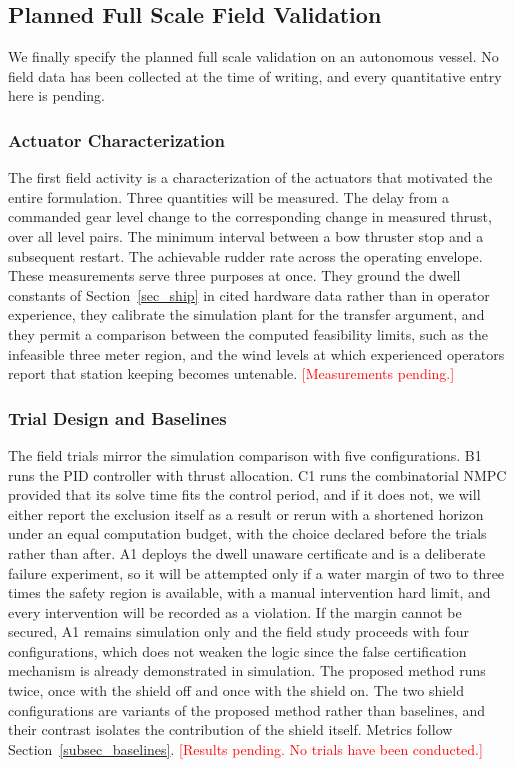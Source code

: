 \documentclass[journal]{IEEEtran}
\begin{document}
\subsection{Planned Full Scale Field Validation}\label{sec_fullscale}


We finally specify the planned full scale validation on an autonomous vessel. No field data has been collected at the time of writing, and every quantitative entry here is pending.

\subsubsection{Actuator Characterization}

The first field activity is a characterization of the actuators that motivated the entire formulation. Three quantities will be measured. The delay from a commanded gear level change to the corresponding change in measured thrust, over all level pairs. The minimum interval between a bow thruster stop and a subsequent restart. The achievable rudder rate across the operating envelope. These measurements serve three purposes at once. They ground the dwell constants of Section~\ref{sec_ship} in cited hardware data rather than in operator experience, they calibrate the simulation plant for the transfer argument, and they permit a comparison between the computed feasibility limits, such as the infeasible three meter region, and the wind levels at which experienced operators report that station keeping becomes untenable. \textcolor{red}{[Measurements pending.]}

\subsubsection{Trial Design and Baselines}

The field trials mirror the simulation comparison with five configurations. B1 runs the PID controller with thrust allocation. C1 runs the combinatorial NMPC provided that its solve time fits the control period, and if it does not, we will either report the exclusion itself as a result or rerun with a shortened horizon under an equal computation budget, with the choice declared before the trials rather than after. A1 deploys the dwell unaware certificate and is a deliberate failure experiment, so it will be attempted only if a water margin of two to three times the safety region is available, with a manual intervention hard limit, and every intervention will be recorded as a violation. If the margin cannot be secured, A1 remains simulation only and the field study proceeds with four configurations, which does not weaken the logic since the false certification mechanism is already demonstrated in simulation. The proposed method runs twice, once with the shield off and once with the shield on. The two shield configurations are variants of the proposed method rather than baselines, and their contrast isolates the contribution of the shield itself. Metrics follow Section~\ref{subsec_baselines}. \textcolor{red}{[Results pending. No trials have been conducted.]}
\end{document}

